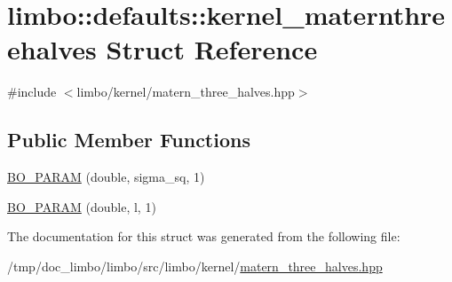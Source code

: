 \hypertarget{structlimbo_1_1defaults_1_1kernel__maternthreehalves}{}\section{limbo\+:\+:defaults\+:\+:kernel\+\_\+maternthreehalves Struct Reference}
\label{structlimbo_1_1defaults_1_1kernel__maternthreehalves}


{\ttfamily \#include $<$limbo/kernel/matern\+\_\+three\+\_\+halves.\+hpp$>$}

\subsection*{Public Member Functions}
\begin{DoxyCompactItemize}
\item 
\hyperlink{group__kernel__defaults_ga76321c51e14ac1db904dd1411771e391}{B\+O\+\_\+\+P\+A\+R\+AM} (double, sigma\+\_\+sq, 1)
\item 
\hyperlink{group__kernel__defaults_ga5e0b13e8fe6cc8b335d86ed94631225d}{B\+O\+\_\+\+P\+A\+R\+AM} (double, l, 1)
\end{DoxyCompactItemize}


The documentation for this struct was generated from the following file\+:\begin{DoxyCompactItemize}
\item 
/tmp/doc\+\_\+limbo/limbo/src/limbo/kernel/\hyperlink{matern__three__halves_8hpp}{matern\+\_\+three\+\_\+halves.\+hpp}\end{DoxyCompactItemize}
